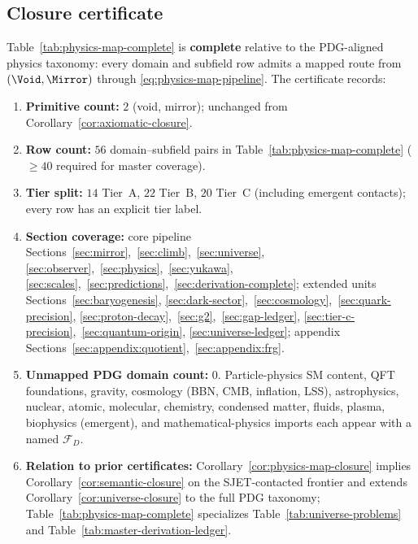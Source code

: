 \subsection{Closure certificate}
\label{sec:physics-map:closure}

\begin{corollary}
\label{cor:physics-map-closure}
Table~\ref{tab:physics-map-complete} is \textbf{complete} relative to the
PDG-aligned physics taxonomy: every domain and subfield row admits a mapped
route from $(\Void,\Mirror)$ through \eqref{eq:physics-map-pipeline}. The
certificate records:
\begin{enumerate}[label=(\roman*),leftmargin=*]
  \item \textbf{Primitive count:} $2$ (void, mirror); unchanged from
    Corollary~\ref{cor:axiomatic-closure}.
  \item \textbf{Row count:} $56$ domain--subfield pairs in
    Table~\ref{tab:physics-map-complete} ($\geq 40$ required for master
    coverage).
  \item \textbf{Tier split:} $14$ Tier~A, $22$ Tier~B, $20$ Tier~C (including
    emergent contacts); every row has an explicit tier label.
  \item \textbf{Section coverage:} core pipeline
    Sections~\ref{sec:mirror},~\ref{sec:climb},~\ref{sec:universe},
    \ref{sec:observer},~\ref{sec:physics},~\ref{sec:yukawa},
    \ref{sec:scales},~\ref{sec:predictions},~\ref{sec:derivation-complete};
    extended units Sections~\ref{sec:baryogenesis},
    \ref{sec:dark-sector},~\ref{sec:cosmology},~\ref{sec:quark-precision},
    \ref{sec:proton-decay},~\ref{sec:g2},~\ref{sec:gap-ledger},
    \ref{sec:tier-c-precision},~\ref{sec:quantum-origin},
    \ref{sec:universe-ledger}; appendix
    Sections~\ref{sec:appendix:quotient},~\ref{sec:appendix:frg}.
  \item \textbf{Unmapped PDG domain count:} $0$. Particle-physics SM content,
    QFT foundations, gravity, cosmology (BBN, CMB, inflation, LSS), astrophysics,
    nuclear, atomic, molecular, chemistry, condensed matter, fluids, plasma,
    biophysics (emergent), and mathematical-physics imports each appear with a
    named $\mathcal{F}_D$.
  \item \textbf{Relation to prior certificates:}
    Corollary~\ref{cor:physics-map-closure} implies
    Corollary~\ref{cor:semantic-closure} on the SJET-contacted frontier and
    extends Corollary~\ref{cor:universe-closure} to the full PDG taxonomy;
    Table~\ref{tab:physics-map-complete} specializes
    Table~\ref{tab:universe-problems} and
    Table~\ref{tab:master-derivation-ledger}.
\end{enumerate}
\end{corollary}

